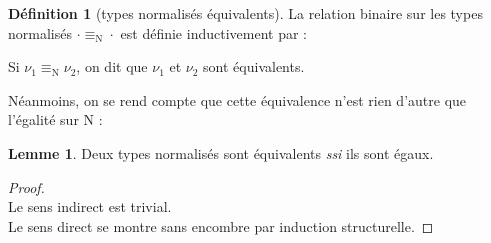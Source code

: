 \documentclass[a4paper]{report}
\newenvironment{preuve} 
  {\begin{proof}~\\} 
  {\end{proof}}
\theoremstyle{definition}
\newtheorem{definition}[theoreme]{Définition}
\newtheorem{lemme}[theoreme]{Lemme}
\newcommand{\interval}[2]{[\![#1\,;#2]\!]}
\newcommand{\mset}[1]{\{\![#1]\!\}}
\newcommand{\ssi}{\textit{ssi}\xspace}
\newcommand{\F}{\mathscr{F}}
\newcommand{\N}{\mathrm{N}}
\begin{document}
\begin{definition}[types normalisés équivalents]
  La relation binaire sur les types normalisés $\cdot \equiv_\N \cdot$ est définie inductivement par :
  Si $\nu_1 \equiv_\N \nu_2$, on dit que $\nu_1$ et $\nu_2$ sont équivalents.
\end{definition}

Néanmoins, on se rend compte que cette équivalence n'est rien d'autre que l'égalité sur $\N$ :

\begin{lemme}
  Deux types normalisés sont équivalents \ssi ils sont égaux.
\end{lemme}

\begin{preuve}
  Le sens indirect est trivial. \\
  Le sens direct se montre sans encombre par induction structurelle.
\end{preuve}
\end{document}
